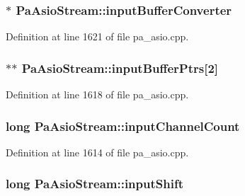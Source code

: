 \subsubsection[{\texorpdfstring{input\+Buffer\+Converter}{inputBufferConverter}}]{$\ast$ Pa\+Asio\+Stream\+::input\+Buffer\+Converter}\hypertarget{struct_pa_asio_stream_a0cba4fd052886fae39f3a7e45ec35034}{}\label{struct_pa_asio_stream_a0cba4fd052886fae39f3a7e45ec35034}


Definition at line 1621 of file pa\+\_\+asio.\+cpp.

\subsubsection[{\texorpdfstring{input\+Buffer\+Ptrs}{inputBufferPtrs}}]{$\ast$$\ast$ Pa\+Asio\+Stream\+::input\+Buffer\+Ptrs\mbox{[}2\mbox{]}}\hypertarget{struct_pa_asio_stream_af25193d33adf5418364e04c10d6e8b86}{}\label{struct_pa_asio_stream_af25193d33adf5418364e04c10d6e8b86}


Definition at line 1618 of file pa\+\_\+asio.\+cpp.

\subsubsection[{\texorpdfstring{input\+Channel\+Count}{inputChannelCount}}]{\setlength{\rightskip}{0pt plus 5cm}long Pa\+Asio\+Stream\+::input\+Channel\+Count}\hypertarget{struct_pa_asio_stream_acf80c90b4ca3454b3643b2873724fdca}{}\label{struct_pa_asio_stream_acf80c90b4ca3454b3643b2873724fdca}


Definition at line 1614 of file pa\+\_\+asio.\+cpp.

\subsubsection[{\texorpdfstring{input\+Shift}{inputShift}}]{\setlength{\rightskip}{0pt plus 5cm}long Pa\+Asio\+Stream\+::input\+Shift}\hypertarget{struct_pa_asio_stream_a26c73578d78f8581d21ad2b3c45e642f}{}\label{struct_pa_asio_stream_a26c73578d78f8581d21ad2b3c45e642f}


